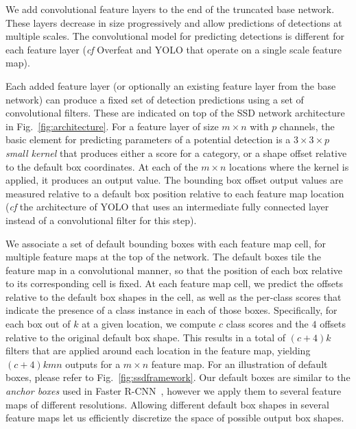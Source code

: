 \documentclass[runningheads]{llncs}
\begin{document}
\smallskip
{} We add convolutional feature layers to the end of the truncated base network. These layers decrease in size progressively and allow predictions of detections at multiple scales.  The convolutional model for predicting detections is different for each feature layer ({\em cf} Overfeat\cite{sermanet2013overfeat} and YOLO\cite{redmon2015you} that operate on a single scale feature map).

\smallskip
{} Each added feature layer (or optionally an existing feature layer from the base network) can produce a fixed set of detection predictions using a set of convolutional filters. These are indicated on top of the SSD network architecture in Fig.~\ref{fig:architecture}.  For a feature layer of size $m \times n$ with $p$ channels, the basic element for predicting parameters of a potential detection is a $3 \times 3 \times p$ {\em small kernel} that produces either a score for a category, or a shape offset relative to the default box coordinates. At each of the $m \times n$ locations where the kernel is applied, it produces an output value. The bounding box offset output values are measured relative to a default box position relative to each feature map location ({\em cf} the architecture of YOLO\cite{redmon2015you} that uses an intermediate fully connected layer instead of a convolutional filter for this step).

\smallskip
{} We associate a set of default bounding boxes with each feature map cell, for multiple feature maps at the top of the network. The default boxes tile the feature map in a convolutional manner, so that the position of each box relative to its corresponding cell is fixed. At each feature map cell, we predict the offsets relative to the default box shapes in the cell, as well as the per-class scores that indicate the presence of a class instance in each of those boxes. Specifically, for each box out of $k$ at a given location, we compute $c$ class scores and the $4$ offsets relative to the original default box shape. This results in a total of $(c+4)k$ filters that are applied around each location in the feature map, yielding $(c+4)kmn$ outputs for a $m\times n$ feature map. For an illustration of default boxes, please refer to Fig.~\ref{fig:ssdframework}. Our default boxes are similar to the {\it anchor boxes} used in Faster R-CNN~\cite{ren2015faster}, however we apply them to several feature maps of different resolutions. Allowing different default box shapes in several feature maps let us efficiently discretize the space of possible output box shapes.
\end{document}
